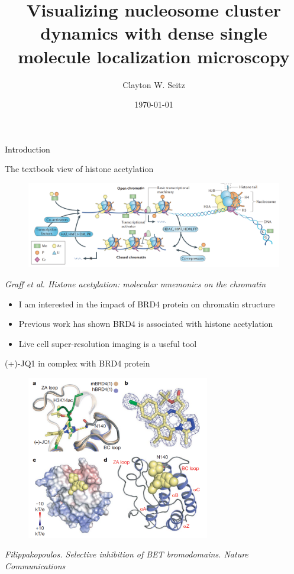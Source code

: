 \documentclass{beamer}					%
\title{Visualizing nucleosome cluster dynamics with dense single molecule localization microscopy}	%
\author{Clayton W. Seitz}								%
\date{\today}									%
\begin{document}
\begin{frame}
  \titlepage
\end{frame}


%


\begin{frame}
\frametitle{}
\centering
\Large \textcolor{black}{Introduction}
\end{frame}


\begin{frame}{The textbook view of histone acetylation}
\begin{figure}
\includegraphics[width=13cm]{Histones.png}
\end{figure}
\textit{Graff et al. Histone acetylation: molecular
mnemonics on the chromatin}
\vspace{0.1in}
\begin{itemize}
\item I am interested in the impact of BRD4 protein on chromatin structure
\item Previous work has shown BRD4 is associated with histone acetylation
\item Live cell super-resolution imaging is a useful tool
\end{itemize}
\end{frame}

\begin{frame}{(+)-JQ1 in complex with BRD4 protein}
\begin{figure}
\includegraphics[width=8cm]{JQ1.png}
\end{figure}
\textit{Filippakopoulos. Selective inhibition of BET bromodomains. Nature Communications}
\end{frame}
\end{document}
